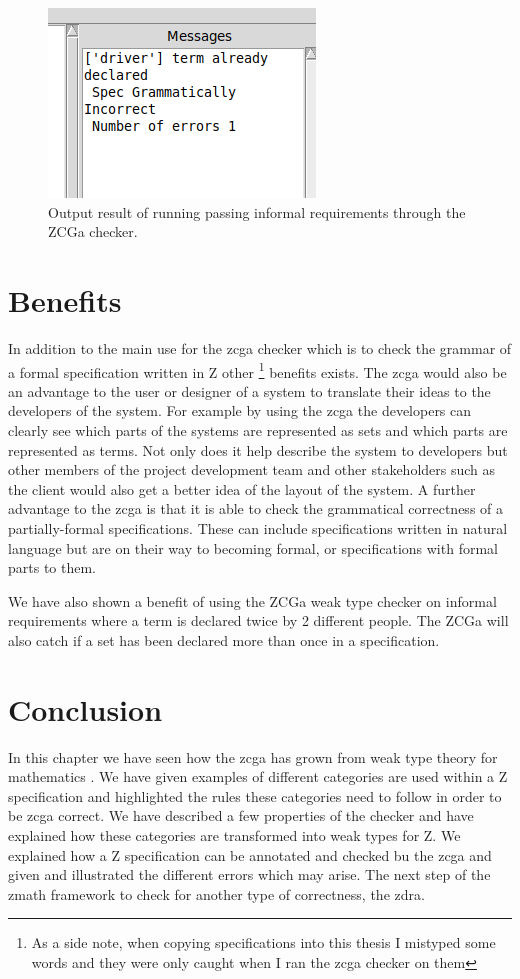  \begin{figure}[H]
    \centering
    \includegraphics[scale=0.18]{Figures/zcga/driverdeclared.png}
    \caption{Output result of running passing informal requirements
         through the ZCGa checker. \label{fig:zcgaautopilotresult}}
    \end{figure}

\section{Benefits}

In addition to the main use for the \gls{zcga} checker which is to check the
grammar of a formal specification written in Z other \footnote{As a side note,
when copying specifications into this thesis I mistyped some words and they were
only caught when I ran the \gls{zcga} checker on them} benefits exists. The
\gls{zcga} would also be an advantage to the user or designer of a system to
translate their ideas to the developers of the system. For example by using the
\gls{zcga} the developers can clearly see which parts of the systems are
represented as sets and which parts are represented as terms. Not only does it
help describe the system to developers but other members of the project
development team and other stakeholders such as the client would also get a
better idea of the layout of the system. A further advantage to the \gls{zcga}
is that it is able to check the grammatical correctness of a partially-formal
specifications. These can include specifications written in natural
language but are on their way to becoming formal, or specifications with formal
parts to them.

We have also shown a benefit of using the ZCGa weak type checker on informal
requirements where a term is declared twice by 2 different people. The ZCGa will
also catch if a set has been declared more than once in a specification.

\section{Conclusion}
In this chapter we have seen how the \gls{zcga} has grown from weak type theory
for mathematics \cite{wtt}. We have given examples of different categories are
used within a Z specification and highlighted the rules these categories need to
follow in order to be \gls{zcga} correct. We have described a few properties of
the checker and have explained how these categories are transformed into weak
types for Z. We explained how a Z specification can be annotated and checked bu
the \gls{zcga} and given and illustrated the different errors which may arise.
The next step of the \gls{zmath} framework to check for another type of
correctness, the \gls{zdra}.
